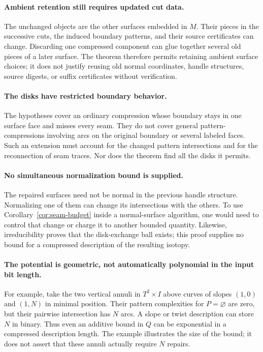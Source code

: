 \paragraph{Ambient retention still requires updated cut data.}
The unchanged objects are the other surfaces embedded in $M$.  Their
pieces in the successive cuts, the induced boundary patterns, and their
source certificates can change.  Discarding one compressed component can
glue together several old pieces of a later surface.  The theorem therefore
permits retaining ambient surface choices; it does not justify reusing
old normal coordinates, handle structures, source digests, or suffix
certificates without verification.

\paragraph{The disks have restricted boundary behavior.}
The hypotheses cover an ordinary compression whose boundary stays in one
surface face and misses every seam.  They do not cover general
pattern-compressions involving arcs on the original boundary or several
labeled faces.  Such an extension must account for the changed pattern
intersections and for the reconnection of seam traces.  Nor does the theorem
find all the disks it permits.

\paragraph{No simultaneous normalization bound is supplied.}
The repaired surfaces need not be normal in the previous handle structure.
Normalizing one of them can change its intersections with the others.  To
use Corollary~\ref{cor:seam-budget} inside a normal-surface algorithm, one
would need to control that change or charge it to another bounded
quantity.  Likewise, irreducibility proves that the disk-exchange ball
exists; this proof supplies no bound for a compressed description of the
resulting isotopy.

\paragraph{The potential is geometric, not automatically polynomial in
the input bit length.}
For example, take the two vertical annuli in $T^2\times I$ above curves
of slopes $(1,0)$ and $(1,N)$ in minimal position.  Their pattern
complexities for $P=\varnothing$ are zero, but their pairwise intersection
has $N$ arcs.  A slope or twist description can store $N$ in binary.
Thus even an additive bound in $Q$ can be exponential in a compressed
description length.  The example illustrates the size of the bound; it
does not assert that these annuli actually require $N$ repairs.

